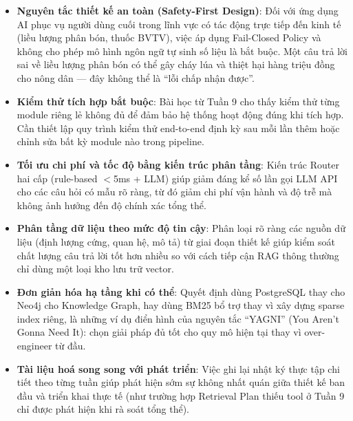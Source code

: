 \begin{itemize}
    \item \textbf{Nguyên tắc thiết kế an toàn (Safety-First Design)}: Đối với ứng dụng AI phục vụ người dùng cuối trong lĩnh vực có tác động trực tiếp đến kinh tế (liều lượng phân bón, thuốc BVTV), việc áp dụng Fail-Closed Policy và không cho phép mô hình ngôn ngữ tự sinh số liệu là bắt buộc. Một câu trả lời sai về liều lượng phân bón có thể gây cháy lúa và thiệt hại hàng triệu đồng cho nông dân --- đây không thể là ``lỗi chấp nhận được''.

    \item \textbf{Kiểm thử tích hợp bắt buộc}: Bài học từ Tuần 9 cho thấy kiểm thử từng module riêng lẻ không đủ để đảm bảo hệ thống hoạt động đúng khi tích hợp. Cần thiết lập quy trình kiểm thử end-to-end định kỳ sau mỗi lần thêm hoặc chỉnh sửa bất kỳ module nào trong pipeline.

    \item \textbf{Tối ưu chi phí và tốc độ bằng kiến trúc phân tầng}: Kiến trúc Router hai cấp (rule-based $<$5ms + LLM) giúp giảm đáng kể số lần gọi LLM API cho các câu hỏi có mẫu rõ ràng, từ đó giảm chi phí vận hành và độ trễ mà không ảnh hưởng đến độ chính xác tổng thể.

    \item \textbf{Phân tầng dữ liệu theo mức độ tin cậy}: Phân loại rõ ràng các nguồn dữ liệu (định lượng cứng, quan hệ, mô tả) từ giai đoạn thiết kế giúp kiểm soát chất lượng câu trả lời tốt hơn nhiều so với cách tiếp cận RAG thông thường chỉ dùng một loại kho lưu trữ vector.

    \item \textbf{Đơn giản hóa hạ tầng khi có thể}: Quyết định dùng PostgreSQL thay cho Neo4j cho Knowledge Graph, hay dùng BM25 bổ trợ thay vì xây dựng sparse index riêng, là những ví dụ điển hình của nguyên tắc ``YAGNI'' (You Aren't Gonna Need It): chọn giải pháp đủ tốt cho quy mô hiện tại thay vì over-engineer từ đầu.

    \item \textbf{Tài liệu hoá song song với phát triển}: Việc ghi lại nhật ký thực tập chi tiết theo từng tuần giúp phát hiện sớm sự không nhất quán giữa thiết kế ban đầu và triển khai thực tế (như trường hợp Retrieval Plan thiếu tool ở Tuần 9 chỉ được phát hiện khi rà soát tổng thể).
\end{itemize}
